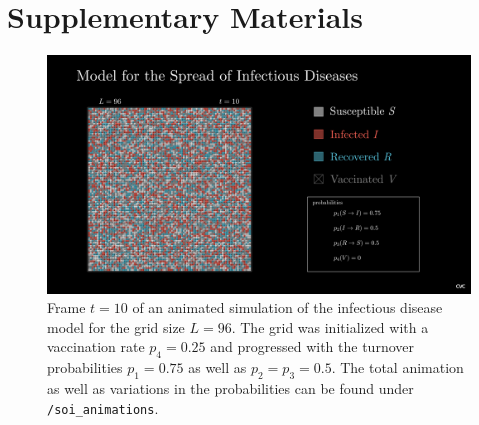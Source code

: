 \section{Supplementary Materials}


\begin{figure}[ht]
    \centering
    \includegraphics[width=1\textwidth]{images/soi_main_scene_75_50_50_25_t10.png}
    \caption{Frame $t=10$ of an animated simulation of the infectious disease model for the grid size $L=96$. The grid was initialized with a vaccination rate $p_4=0.25$ and progressed with 
    the turnover probabilities $p_1=0.75$ as well as $p_2=p_3=0.5$. The total animation as well as variations in the probabilities can be found under \texttt{/soi\_animations}.}\label{fig:apx_animation_inf_t}
\end{figure}